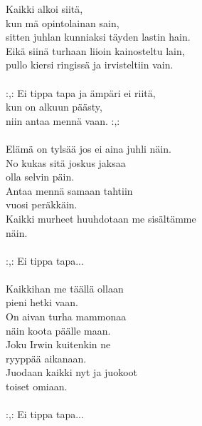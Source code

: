 
Kaikki alkoi siitä, \\ kun mä opintolainan sain, \\ sitten juhlan kunniaksi täyden lastin hain. \\ Eikä siinä turhaan liioin kainosteltu lain, \\ pullo kiersi ringissä ja irvisteltiin vain. \\ \hspace{10mm} \\ :,: Ei tippa tapa ja ämpäri ei riitä, \\ kun on alkuun päästy, \\ niin antaa mennä vaan. :,: \\ \hspace{10mm} \\ Elämä on tylsää jos ei aina juhli näin. \\ No kukas sitä joskus jaksaa \\ olla selvin päin. \\ Antaa mennä samaan tahtiin \\ vuosi peräkkäin. \\ Kaikki murheet huuhdotaan me sisältämme \\ näin. \\ \hspace{10mm} \\ :,: Ei tippa tapa... \\ \hspace{10mm} \\ Kaikkihan me täällä ollaan \\ pieni hetki vaan. \\ On aivan turha mammonaa \\ näin koota päälle maan. \\ Joku Irwin kuitenkin ne \\ ryyppää aikanaan. \\ Juodaan kaikki nyt ja juokoot \\ toiset omiaan. \\ \hspace{10mm} \\ :,: Ei tippa tapa...
